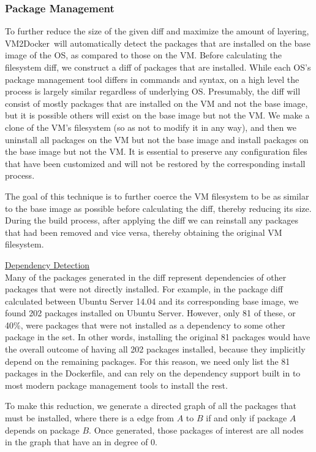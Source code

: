 \documentclass[\myfontsize, letterpaper]{article}
\newcommand{\projectname}{VM2Docker}
\begin{document}
\subsubsection{Package Management}
To further reduce the size of the given diff and maximize the amount of layering, \projectname\ will automatically detect the packages that are installed on the base image of the OS, as compared to those on the VM. Before calculating the filesystem diff, we construct a diff of packages that are installed. While each OS's package management tool differs in commands and syntax, on a high level the process is largely similar regardless of underlying OS. Presumably, the diff will consist of mostly packages that are installed on the VM and not the base image, but it is possible others will exist on the base image but not the VM. We make a clone of the VM's filesystem (so as not to modify it in any way), and then we uninstall all packages on the VM but not the base image and install packages on the base image but not the VM. It is essential to preserve any configuration files that have been customized and will not be restored by the corresponding install process.

The goal of this technique is to further coerce the VM filesystem to be as similar to the base image as possible before calculating the diff, thereby reducing its size. During the build process, after applying the diff we can reinstall any packages that had been removed and vice versa, thereby obtaining the original VM filesystem.


\underline{Dependency Detection}\\
Many of the packages generated in the diff represent dependencies of other packages that were not directly installed. For example, in the package diff calculated between Ubuntu Server 14.04 and its corresponding base image, we found 202 packages installed on Ubuntu Server. However, only 81 of these, or 40\%, were packages that were not installed as a dependency to some other package in the set. In other words, installing the original 81 packages would have the overall outcome of having all 202 packages installed, because they implicitly depend on the remaining packages. For this reason, we need only list the 81 packages in the Dockerfile, and can rely on the dependency support built in to most modern package management tools to install the rest.

To make this reduction, we generate a directed graph of all the packages that must be installed, where there is a edge from $A$ to $B$ if and only if package $A$ depends on package $B$. Once generated, those packages of interest are all nodes in the graph that have an in degree of 0.
\end{document}
